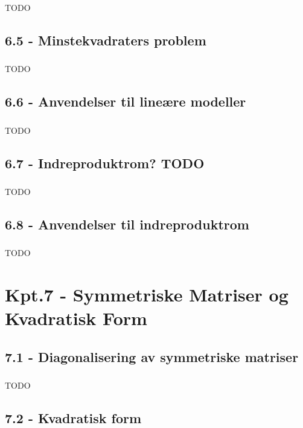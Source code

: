 \documentclass{article}
\begin{document}
      \subsubsection{}
        TODO
    \subsection{6.5 - Minstekvadraters problem}
      \subsubsection{}
        TODO
    \subsection{6.6 - Anvendelser til lineære modeller}
      \subsubsection{}
        TODO
    \subsection{6.7 - Indreproduktrom? TODO}
      \subsubsection{}
        TODO
    \subsection{6.8 - Anvendelser til indreproduktrom}
      \subsubsection{}
        TODO
  \section{Kpt.7 - Symmetriske Matriser og Kvadratisk Form}
    \subsection{7.1 - Diagonalisering av symmetriske matriser}
      \subsubsection{}
        TODO
    \subsection{7.2 - Kvadratisk form}
\end{document}
